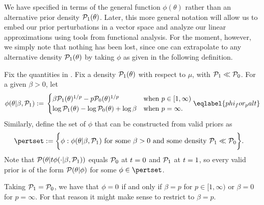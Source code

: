 We have specified  in terms of the general function
$\phi(\theta)$ rather than an alternative prior density $\mathcal{P}_{1}(\theta)$. Later,
this more general notation will allow us to embed our prior perturbations in a
vector space and analyze our linear approximations using tools from functional
analysis.  For the moment, however, we simply note that nothing has been lost,
since one can extrapolate to any alternative density $\mathcal{P}_{1}(\theta)$ by taking
$\phi$ as given in the following definition.


\begin{defn}
%
Fix the quantities in .  Fix a density $\mathcal{P}_{1}(\theta)$
with respect to $\mu$, with $\mathcal{P}_{1} \ll \mathcal{P}_{0}$. For a given $\beta > 0$, let
%
\begin{align}
%
\phi(\theta | \beta, \palt) :={}
\begin{cases}
\beta \palt(\theta)^{1/p} - p \pbase(\theta)^{1/p}
    & \textrm{when }p \in [1, \infty) \\
\log \palt(\theta) - \log \pbase(\theta) + \log \beta
    & \textrm{when }p = \infty.
\end{cases} \eqlabel{phi_for_palt}
%
\end{align}
%
Similarly, define the set of $\phi$ that can be constructed from
valid priors as
%
\begin{align*}
%
\pertset := \bigg\{&
    \phi:  \phi(\theta | \beta, \palt) %
    \textrm{ for some }\beta > 0\textrm{ and some density }\palt \ll \pbase
\bigg\}.
%
\end{align*}
%
Note that $\mathcal{P}(\theta \vert t \phi(\cdot \vert \beta, \mathcal{P}_{1}))$ equals $\mathcal{P}_{0}$
at $t = 0$ and $\mathcal{P}_{1}$ at $t = 1$, so every valid prior is of the form
$\mathcal{P}(\theta \vert \phi)$ for some $\phi \in \pertset$.
%
\end{defn}



\begin{ex}
%
Taking $\mathcal{P}_{1} = \mathcal{P}_{0}$, we have that $\phi = 0$ if and only if
$\beta = p$ for $p \in [1, \infty)$ or $\beta = 0$ for $p = \infty$.
For that reason it might make sense to restrict to $\beta = p$.
%
\end{ex}

